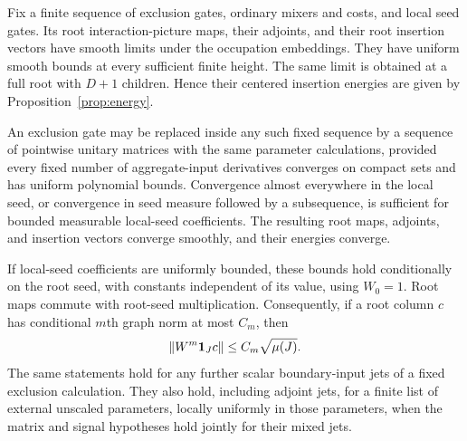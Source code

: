 \begin{theorem}\label{thm:gate-calculus}
Fix a finite sequence of exclusion gates, ordinary mixers and
costs, and local seed gates.  Its root interaction-picture maps,
their adjoints, and their root insertion vectors have smooth
limits under the occupation embeddings.  They have uniform
smooth bounds at every sufficient finite height.  The same
limit is obtained at a full root with $D+1$ children.  Hence
their centered insertion energies are given by
Proposition~\ref{prop:energy}.

An exclusion gate may be replaced inside any such fixed
sequence by a sequence of pointwise unitary matrices with the
same parameter calculations, provided every fixed number of
aggregate-input derivatives converges on compact sets and has
uniform polynomial bounds.  Convergence almost everywhere in
the local seed, or convergence in seed measure followed by a
subsequence, is sufficient for bounded measurable local-seed
coefficients.  The resulting root maps, adjoints, and insertion
vectors converge smoothly, and their energies converge.

If local-seed coefficients are uniformly bounded, these bounds
hold conditionally on the root seed, with constants independent
of its value, using $W_0=1$.  Root maps commute with root-seed
multiplication.  Consequently, if a root column $c$ has
conditional $m$th graph norm at most $C_m$, then
\begin{equation}\label{eq:masked-column-bound}
 \|W^m\mathbf 1_Jc\|\leq C_m\sqrt{\mu(J)}.
\end{equation}
The same statements hold for any further scalar boundary-input
jets of a fixed exclusion calculation.  They also hold,
including adjoint jets, for a finite list of external unscaled
parameters, locally uniformly in those parameters, when the
matrix and signal hypotheses hold jointly for their mixed jets.
\end{theorem}

